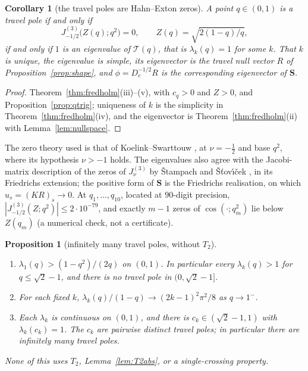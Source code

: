 \documentclass[11pt]{article}
\theoremstyle{plain}
\newtheorem{corollary}[theorem]{Corollary}
\newtheorem{proposition}[theorem]{Proposition}
\theoremstyle{definition}
\theoremstyle{remark}
\begin{document}
\begin{corollary}[the travel poles are Hahn--Exton zeros]\label{cor:qbessel}
A point $q\in(0,1)$ is a travel pole if and only if
\[
   J^{(3)}_{-1/2}\bigl(Z(q);q^2\bigr)=0,\qquad Z(q)=\sqrt{2(1-q)/q},
\]
if and only if $1$ is an eigenvalue of $\mathcal T(q)$, that is $\lambda_k(q)=1$ for some $k$. That
$k$ is unique, the eigenvalue is simple, its eigenvector is the travel null vector $R$ of
Proposition~\ref{prop:shape}, and $\phi=D_e^{-1/2}R$ is the corresponding eigenvector of $\mathbf S$.
\end{corollary}

\begin{proof}
Theorem~\ref{thm:fredholm}\textup{(iii)--(v)}, with $c_q>0$ and $Z>0$, and
Proposition~\ref{prop:qtrig}; uniqueness of $k$ is the simplicity in
Theorem~\ref{thm:fredholm}\textup{(iv)}, and the eigenvector is Theorem~\ref{thm:fredholm}\textup{(ii)}
with Lemma~\ref{lem:nullspace}.
\end{proof}

\noindent The zero theory used is that of Koelink--Swarttouw \cite{KoelinkSwarttouw1994}, at
$\nu=-\tfrac12$ and base $q^2$, where its hypothesis $\nu>-1$ holds. The eigenvalues also agree with
the Jacobi-matrix description of the zeros of $J^{(3)}_\nu$ by \v{S}tampach and \v{S}\v{t}ov\'{\i}\v{c}ek
\cite{StampachStovicek2014}, in its Friedrichs extension; the positive form of $\mathbf S$ is the
Friedrichs realisation, on which $u_s=(KR)_s\to0$. At $q_1,\dots,q_{10}$, located at $90$-digit
precision, $|J^{(3)}_{-1/2}(Z;q^2)|\le2\cdot10^{-79}$, and exactly $m-1$ zeros of
$\cos(\cdot;q_m^2)$ lie below $Z(q_m)$ (a numerical check, not a certificate).

\begin{proposition}[infinitely many travel poles, without $T_2$]\label{prop:infpolesalt}
\begin{enumerate}[label=\textup{(\alph*)},leftmargin=2.2em,itemsep=0.1em,topsep=0.2em]
\item $\lambda_1(q)>(1-q^2)/(2q)$ on $(0,1)$. In particular every $\lambda_k(q)>1$ for
$q\le\sqrt2-1$, and there is no travel pole in $(0,\sqrt2-1]$.
\item For each fixed $k$, $\lambda_k(q)/(1-q)\to(2k-1)^2\pi^2/8$ as $q\to1^-$.
\item Each $\lambda_k$ is continuous on $(0,1)$, and there is $c_k\in(\sqrt2-1,1)$ with
$\lambda_k(c_k)=1$. The $c_k$ are pairwise distinct travel poles; in particular there are infinitely
many travel poles.
\end{enumerate}
None of this uses $T_2$, Lemma~\ref{lem:T2abs}, or a single-crossing property.
\end{proposition}
\end{document}
